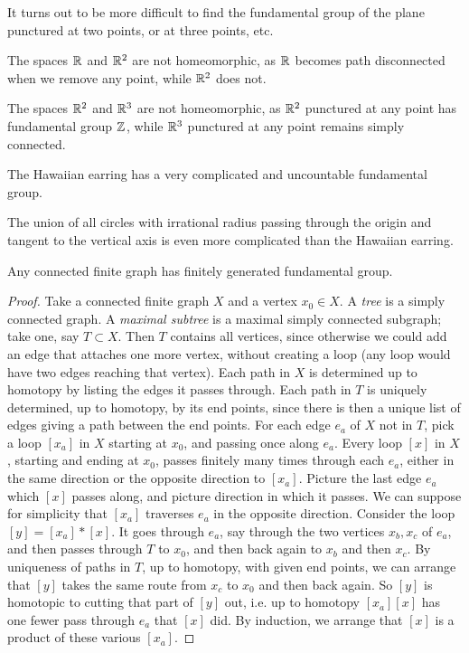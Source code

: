 \begin{example}
It turns out to be more difficult to find the fundamental group of the plane punctured at two points, or at three points, etc.
\end{example}
\begin{example}
The spaces \(\mathbb{R}^{}\) and \(\mathbb{R}^{2}\) are not homeomorphic, as \(\mathbb{R}^{}\) becomes path disconnected when we remove any point, while \(\mathbb{R}^{2}\) does not.
\end{example}
\begin{example}
The spaces \(\mathbb{R}^{2}\) and \(\mathbb{R}^{3}\) are not homeomorphic, as \(\mathbb{R}^{2}\) punctured at any point has fundamental group \(\mathbb{Z}^{}\), while \(\mathbb{R}^{3}\) punctured at any point remains simply connected.
\end{example}
\begin{exampleAndImage}{2cm}
The Hawaiian earring has a very complicated and uncountable fundamental group.
\tcblower

\end{exampleAndImage}
\begin{example}
The union of all circles with irrational radius passing through the origin and tangent to the vertical axis is even more complicated than the Hawaiian earring.
\end{example}
\begin{lemma}
Any connected finite graph has finitely generated fundamental group.
\end{lemma}
\begin{proof}
Take a connected finite graph \(X\) and a vertex \(x_0 \in X\).
A \emph{tree} is a simply connected graph.
A \emph{maximal subtree} is a maximal simply connected subgraph; take one, say \(T \subset X\).
Then \(T\) contains all vertices, since otherwise we could add an edge that attaches one more vertex, without creating a loop (any loop would have two edges reaching that vertex).
Each path in \(X\) is determined up to homotopy by listing the edges it passes through.
Each path in \(T\) is uniquely determined, up to homotopy, by its end points, since there is then a unique list of edges giving a path between the end points. 
For each edge \(e_a\) of \(X\) not in \(T\), pick a loop \([x_a]\) in \(X\) starting at \(x_0\), and passing once along \(e_a\).
Every loop \([x]\) in \(X\), starting and ending at \(x_0\), passes finitely many times through each \(e_a\), either in the same direction or the opposite direction to \([x_a]\).
Picture the last edge \(e_a\) which \([x]\) passes along, and picture direction in which it passes.
We can suppose for simplicity that \([x_a]\) traverses \(e_a\) in the opposite direction.
Consider the loop \([y]=[x_a]*[x]\).
It goes through \(e_a\), say through the two vertices \(x_b,x_c\) of \(e_a\), and then passes through \(T\) to \(x_0\), and then back again to \(x_b\) and then \(x_c\).
By uniqueness of paths in \(T\), up to homotopy, with given end points, we can arrange that \([y]\) takes the same route from \(x_c\) to \(x_0\) and then back again.
So \([y]\) is homotopic to cutting that part of \([y]\) out, i.e. up to homotopy \([x_a][x]\) has one fewer pass through \(e_a\) that \([x]\) did.
By induction, we arrange that \([x]\) is a product of these various \([x_a]\).
\end{proof}
